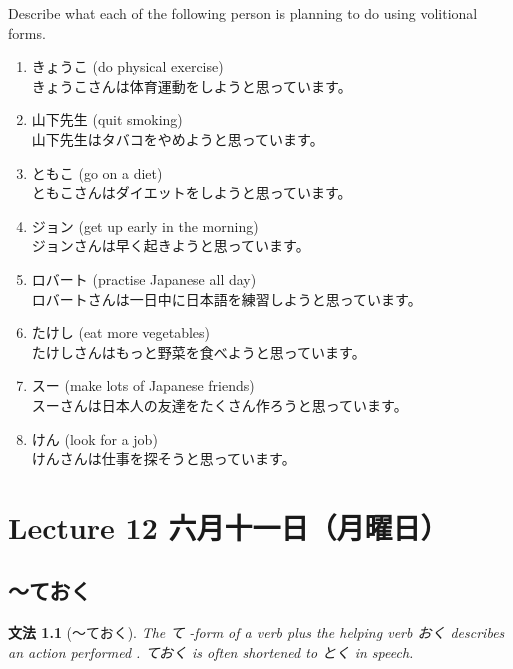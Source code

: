 \documentclass[notoc,notitlepage]{tufte-book}
\newtheorem{grammar}{\faBook \enspace 文法}[section]
\begin{document}
\begin{ex}
  Describe what each of the following person is planning to do using volitional forms.

  \begin{enumerate}
    \item きょうこ (do physical exercise) \\
      きょうこさんは体育運動をしようと思っています。
    \item 山下先生 (quit smoking) \\
      山下先生はタバコをやめようと思っています。
    \item ともこ (go on a diet) \\
      ともこさんはダイエットをしようと思っています。
    \item ジョン (get up early in the morning) \\
      ジョンさんは早く起きようと思っています。
    \item ロバート (practise Japanese all day) \\
      ロバートさんは一日中に日本語を練習しようと思っています。
    \item たけし (eat more vegetables) \\
      たけしさんはもっと野菜を食べようと思っています。
    \item スー (make lots of Japanese friends) \\
      スーさんは日本人の友達をたくさん作ろうと思っています。
    \item けん (look for a job) \\
      けんさんは仕事を探そうと思っています。
  \end{enumerate}
\end{ex}



\chapter{Lecture 12 六月十一日（月曜日）}%
\label{chp:lecture_12_liu_yue_shi_yi_ri_yue_yao_ri_}

\section{〜ておく}%
\label{sec:_teoku}

\begin{grammar}[〜ておく]
\label{grammar:_teoku}
The て -form of a verb plus the helping verb おく describes an action performed . ておく is often shortened to とく in speech.
\end{grammar}
\end{document}
